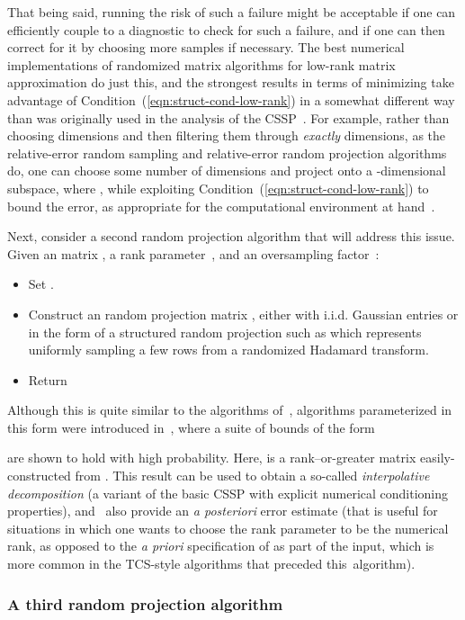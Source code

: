 \documentclass[twoside]{article}
\begin{document}
That being said, running the risk of such a failure might be acceptable if
one can efficiently couple to a diagnostic to check for such a 
failure, and if one can then correct for it by choosing more 
samples if necessary.
The best numerical implementations of randomized matrix algorithms for 
low-rank matrix approximation do just this, and the strongest results in 
terms of minimizing  take advantage of 
Condition~(\ref{eqn:struct-cond-low-rank}) in a somewhat different way than 
was originally used in the analysis of the CSSP~\cite{HMT09_SIREV}.
For example, rather than choosing  dimensions and then 
filtering them through \emph{exactly}  dimensions, as the relative-error 
random sampling and relative-error random projection algorithms do, one can 
choose some number  of dimensions and project onto a 
-dimensional subspace, where , while 
exploiting Condition~(\ref{eqn:struct-cond-low-rank}) to bound the error, as 
appropriate for the computational environment at hand~\cite{HMT09_SIREV}.

Next, consider a second random projection algorithm that will address this 
issue.
Given an  matrix , a rank parameter~, and an oversampling
factor~:
\begin{itemize}
\item
Set .
\item
Construct an  random projection matrix , either with 
i.i.d.  Gaussian entries or in the form of a structured random projection 
such as  which represents uniformly sampling a few rows from 
a randomized Hadamard transform.
\item
Return 
\end{itemize}
Although this is quite similar to the algorithms of~\cite{PRTV00,Sarlos06},
algorithms parameterized in this form were introduced 
in~\cite{MRT11,WLRT08,LWFMRT07}, where a suite of bounds of the form

are shown to hold with high probability.
Here,  is a rank--or-greater matrix easily-constructed from .
This result can be used to obtain a so-called \emph{interpolative 
decomposition} (a variant of the basic CSSP with explicit numerical 
conditioning properties), and~\cite{MRT11,WLRT08,LWFMRT07} also provide an 
\emph{a posteriori} error estimate (that is useful for situations in which 
one wants to choose the rank parameter  to be the numerical rank, as 
opposed to the \emph{a priori} specification of  as part of the input, 
which is more common in the TCS-style algorithms that preceded 
this~algorithm).

\subsubsection{A third random projection algorithm}
\label{sxn:low-rank:proj-third}
\end{document}
